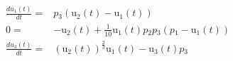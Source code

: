 \begin{align}
\frac{du{_1}(t)}{dt} =& p{_3} \left( \mathrm{u{_2}}\left( t \right) - \mathrm{u{_1}}\left( t \right) \right) \\
0 =&  - \mathrm{u{_2}}\left( t \right) + \frac{1}{10} \mathrm{u{_1}}\left( t \right) p{_2} p{_3} \left( p{_1} - \mathrm{u{_1}}\left( t \right) \right) \\
\frac{du{_3}(t)}{dt} =& \left( \mathrm{u{_2}}\left( t \right) \right)^{\frac{2}{3}} \mathrm{u{_1}}\left( t \right) - \mathrm{u{_3}}\left( t \right) p{_3}
\end{align}
